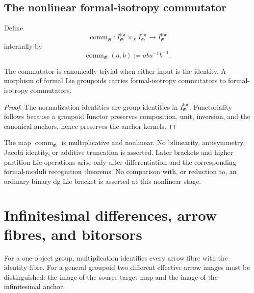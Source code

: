 \subsection{The nonlinear formal-isotropy commutator}

\begin{definition}
\label{def:isotropy-commutator}
Define
\[
    \operatorname{comm}_{\mathfrak G}:
    I^{\mathrm{for}}_{\mathfrak G}
    \times_X
    I^{\mathrm{for}}_{\mathfrak G}
    \longrightarrow
    I^{\mathrm{for}}_{\mathfrak G}
\]
internally by
\[
    \operatorname{comm}_{\mathfrak G}(a,b)
    :=
    aba^{-1}b^{-1}.
\]
\end{definition}

\begin{proposition}
\label{prop:isotropy-commutator-properties}
The commutator is canonically trivial when either input is the identity.
A morphism of formal Lie groupoids carries formal-isotropy commutators to
formal-isotropy commutators.
\end{proposition}

\begin{proof}
The normalization identities are group identities in
$I^{\mathrm{for}}_{\mathfrak G}$.  Functoriality follows because a groupoid
functor preserves composition, unit, inversion, and the canonical anchors,
hence preserves the anchor kernels.
\end{proof}

\begin{remark}
\label{rem:commutator-not-bracket}
The map $\operatorname{comm}_{\mathfrak G}$ is multiplicative and nonlinear.
No bilinearity, antisymmetry, Jacobi identity, or additive truncation is
asserted.  Later brackets and higher partition-Lie operations arise only
after differentiation and the corresponding formal-moduli recognition
theorems.  No comparison with, or reduction to, an ordinary binary dg Lie
bracket is asserted at this nonlinear stage.
\end{remark}


\section{Infinitesimal differences, arrow fibres, and bitorsors}
\label{sec:flg-bitorsor}

For a one-object group, multiplication identifies every arrow fibre with the
identity fibre.  For a general groupoid two different effective arrow images
must be distinguished: the image of the source-target map and the image of
the infinitesimal anchor.

